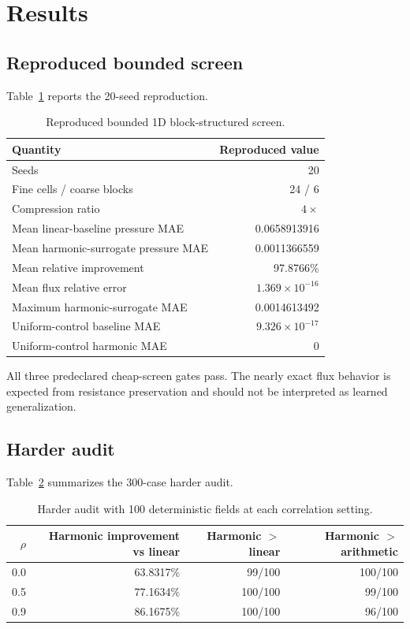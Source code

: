 \documentclass[10pt]{article}
\begin{document}
\section{Results}
\subsection{Reproduced bounded screen}
Table~\ref{tab:bounded} reports the 20-seed reproduction.

\begin{table}[h]
\centering
\caption{Reproduced bounded 1D block-structured screen.}
\label{tab:bounded}
\begin{tabular}{lr}
\toprule
Quantity & Reproduced value \\
\midrule
Seeds & 20 \\
Fine cells / coarse blocks & 24 / 6 \\
Compression ratio & $4\times$ \\
Mean linear-baseline pressure MAE & 0.0658913916 \\
Mean harmonic-surrogate pressure MAE & 0.0011366559 \\
Mean relative improvement & 97.8766\% \\
Mean flux relative error & $1.369\times10^{-16}$ \\
Maximum harmonic-surrogate MAE & 0.0014613492 \\
Uniform-control baseline MAE & $9.326\times10^{-17}$ \\
Uniform-control harmonic MAE & 0 \\
\bottomrule
\end{tabular}
\end{table}

All three predeclared cheap-screen gates pass. The nearly exact flux behavior is expected from resistance preservation and should not be interpreted as learned generalization.

\subsection{Harder audit}
Table~\ref{tab:audit} summarizes the 300-case harder audit.

\begin{table}[h]
\centering
\caption{Harder audit with 100 deterministic fields at each correlation setting.}
\label{tab:audit}
\begin{tabular}{rrrr}
\toprule
$\rho$ & Harmonic improvement vs linear & Harmonic $>$ linear & Harmonic $>$ arithmetic \\
\midrule
0.0 & 63.8317\% & 99/100 & 100/100 \\
0.5 & 77.1634\% & 100/100 & 99/100 \\
0.9 & 86.1675\% & 100/100 & 96/100 \\
\bottomrule
\end{tabular}
\end{table}
\end{document}
